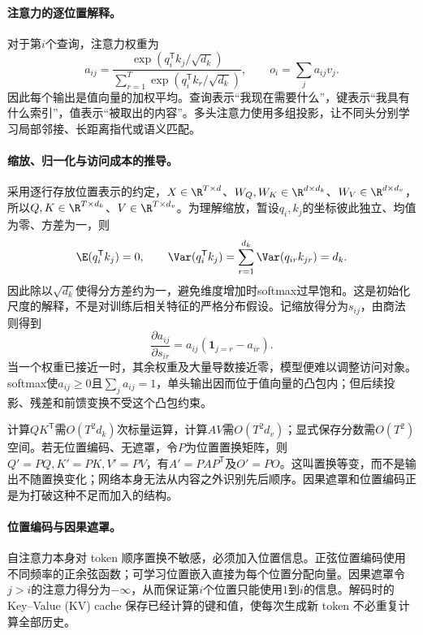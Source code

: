 \paragraph{注意力的逐位置解释。}
对于第$i$个查询，注意力权重为
\begin{equation}
 a_{ij}=\frac{\exp(q_i^{\mathsf T}k_j/\sqrt{d_k})}{\sum_{r=1}^{T}\exp(q_i^{\mathsf T}k_r/\sqrt{d_k})},
 \qquad o_i=\sum_j a_{ij}v_j.
\end{equation}
因此每个输出是值向量的加权平均。查询表示“我现在需要什么”，键表示“我具有什么索引”，值表示“被取出的内容”。多头注意力使用多组投影，让不同头分别学习局部邻接、长距离指代或语义匹配。

\paragraph{缩放、归一化与访问成本的推导。}
采用逐行存放位置表示的约定，$X\in\R^{T\times d}$、$W_Q,W_K\in\R^{d\times d_k}$、$W_V\in\R^{d\times d_v}$，所以$Q,K\in\R^{T\times d_k}$、$V\in\R^{T\times d_v}$。为理解缩放，暂设$q_i,k_j$的坐标彼此独立、均值为零、方差为一，则
\begin{equation}
 \E(q_i^{\mathsf T}k_j)=0,\qquad
 \Var(q_i^{\mathsf T}k_j)=\sum_{r=1}^{d_k}\Var(q_{ir}k_{jr})=d_k.
\end{equation}
因此除以$\sqrt{d_k}$使得分方差约为一，避免维度增加时softmax过早饱和。这是初始化尺度的解释，不是对训练后相关特征的严格分布假设。记缩放得分为$s_{ij}$，由商法则得到
\begin{equation}
 \frac{\partial a_{ij}}{\partial s_{ir}}=a_{ij}(\mathbf1_{j=r}-a_{ir}).
\end{equation}
当一个权重已接近一时，其余权重及大量导数接近零，模型便难以调整访问对象。softmax使$a_{ij}\geq0$且$\sum_j a_{ij}=1$，单头输出因而位于值向量的凸包内；但后续投影、残差和前馈变换不受这个凸包约束。

计算$QK^{\mathsf T}$需$O(T^2d_k)$次标量运算，计算$AV$需$O(T^2d_v)$；显式保存分数需$O(T^2)$空间。若无位置编码、无遮罩，令$P$为位置置换矩阵，则$Q'=PQ,K'=PK,V'=PV$，有$A'=PAP^{\mathsf T}$及$O'=PO$。这叫置换等变，而不是输出不随置换变化；网络本身无法从内容之外识别先后顺序。因果遮罩和位置编码正是为打破这种不足而加入的结构。

\paragraph{位置编码与因果遮罩。}
自注意力本身对 token 顺序置换不敏感，必须加入位置信息。正弦位置编码使用不同频率的正余弦函数；可学习位置嵌入直接为每个位置分配向量。因果遮罩令$j>i$的注意力得分为$-\infty$，从而保证第$i$个位置只能使用$1$到$i$的信息。解码时的 Key--Value (KV) cache 保存已经计算的键和值，使每次生成新 token 不必重复计算全部历史。

